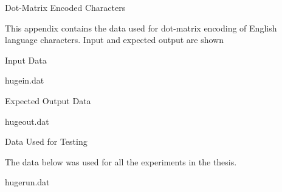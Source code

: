  Dot-Matrix Encoded Characters

This appendix contains the data used for dot-matrix encoding of
English language characters.
Input and expected output are shown

\sapp Input Data

\listing hugein.dat

\sapp Expected Output Data

\listing hugeout.dat

\sapp Data Used for Testing

The data below was used for all the experiments in the thesis.

\listing hugerun.dat

